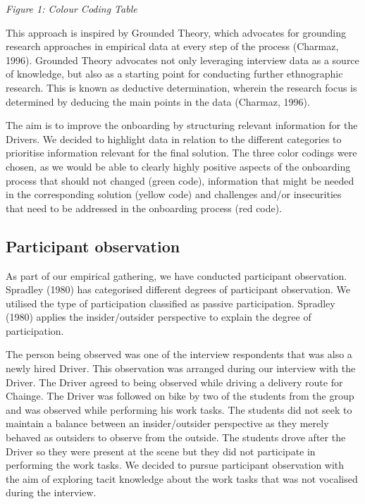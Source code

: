\emph{Figure 1: Colour Coding Table}

This approach is inspired by Grounded Theory, which advocates for
grounding research approaches in empirical data at every step of the
process (Charmaz, 1996). Grounded Theory advocates not only leveraging
interview data as a source of knowledge, but also as a starting point
for conducting further ethnographic research. This is known as deductive
determination, wherein the research focus is determined by deducing the
main points in the data (Charmaz, 1996).

The aim is to improve the onboarding by structuring relevant information
for the Drivers. We decided to highlight data in relation to the
different categories to prioritise information relevant for the final
solution. The three color codings were chosen, as we would be able to
clearly highly positive aspects of the onboarding process that should
not changed (green code), information that might be needed in the
corresponding solution (yellow code) and challenges and/or insecurities
that need to be addressed in the onboarding process (red code).

\hypertarget{sec:participant_obs}{%
\subsection{Participant observation}\label{sec:participant_obs}}

As part of our empirical gathering, we have conducted participant
observation. Spradley (1980) has categorised different degrees of
participant observation. We utilised the type of participation
classified as passive participation. Spradley (1980) applies the
insider/outsider perspective to explain the degree of participation.

The person being observed was one of the interview respondents that was
also a newly hired Driver. This observation was arranged during our
interview with the Driver. The Driver agreed to being observed while
driving a delivery route for Chainge. The Driver was followed on bike by
two of the students from the group and was observed while performing his
work tasks. The students did not seek to maintain a balance between an
insider/outsider perspective as they merely behaved as outsiders to
observe from the outside. The students drove after the Driver so they
were present at the scene but they did not participate in performing the
work tasks. We decided to pursue participant observation with the aim of
exploring tacit knowledge about the work tasks that was not vocalised
during the interview.

